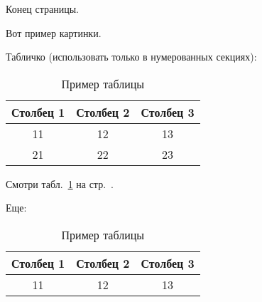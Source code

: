 Конец страницы.

Вот пример картинки.

Табличко (использовать только в нумерованных секциях):
\begin{table}[H] %
		\caption[Заголовок]{Пример таблицы}\label{tab:mytab}
		\begin{tabular}{|c|c|c|} %
		\hline Столбец 1 &  Столбец 2  & Столбец 3 \\ 
		\hline 11 &  12 & 13 \\ 
		\hline 21 &  22 & 23 \\ %
		\hline 
		\end{tabular}
\end{table}
Смотри табл.~\ref{tab:mytab} на стр.~\pageref{tab:mytab}. %

Еще:
\begin{table}[H] %
    \begin{center} %
		\caption[Заголовок]{Пример таблицы}\label{tab:mytab1}
		\begin{tabular}{|c|c|c|} %
		\hline Столбец 1 &  Столбец 2  & Столбец 3 \\ 
		\hline 11 &  12 & 13 \\ 
		\hline 
		\end{tabular}
	\end{center}
\end{table}

\clearpage
